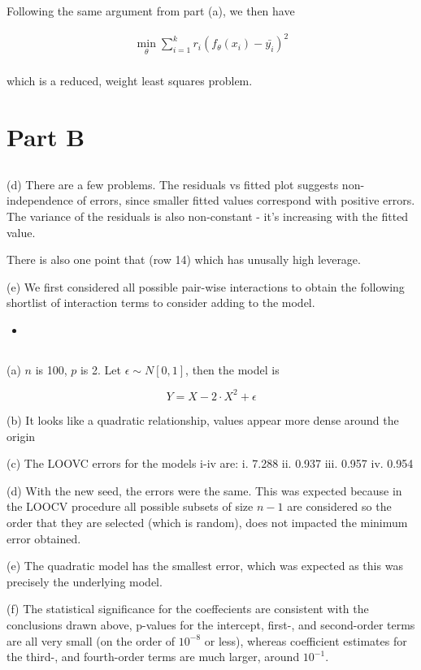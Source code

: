 \documentclass{article}
\begin{document}
    Following the same argument from part (a), we then have

    \[
        \begin{aligned}
            \min_\theta \sum_{i=1}^k r_i(f_\theta(x_i)-\bar{y_i})^2\\
        \end{aligned}
        \]

        which is a reduced, weight least squares problem.

    \section{Part B}
    \subsection{}
    (d) There are a few problems. The residuals vs fitted plot suggests non-independence of errors,  
    since smaller fitted values correspond with positive errors. 
    The variance of the residuals is also non-constant - it's increasing with the fitted value.

    There is also one point that (row 14) which has unusally high leverage. 

    (e) We first considered all possible pair-wise interactions to obtain the following shortlist of 
    interaction terms to consider adding to the model. 

    \begin{itemize}
        \item  
    \end{itemize}


    \subsection{}

    (a)
    $n$ is 100, $p$ is 2. Let $\epsilon \sim N[0,1]$, then the model is

    \[Y = X-2 \cdot X^2 + \epsilon\]

    (b) It looks like a quadratic relationship, values appear more dense around the origin

    (c) The LOOVC errors for the models i-iv are:
    i. 7.288
    ii. 0.937 
    iii. 0.957 
    iv. 0.954

    (d) With the new seed, the errors were the same. This was expected 
    because in the LOOCV procedure all possible subsets of size $n-1$ are 
    considered so the order that they are selected (which is random), does not 
    impacted the minimum error obtained.

    (e) The quadratic model has the smallest error, which was expected as this 
    was precisely the underlying model.

    (f) The statistical significance for the coeffecients are consistent with the 
    conclusions drawn above, p-values for the intercept, first-, and second-order terms are all 
    very small (on the order of $10^{-8}$ or less), whereas coefficient estimates for the third-, 
    and fourth-order terms are much larger, around $10^{-1}$.
 
\end{document}
